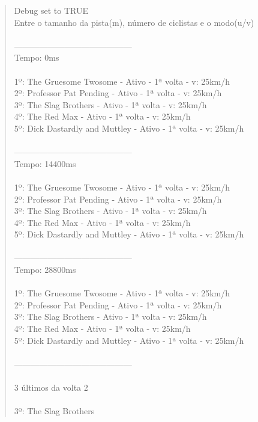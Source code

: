 \documentclass[paper=a4, fontsize=11pt]{scrartcl}
\numberwithin{equation}{section}		%
\numberwithin{figure}{section}			%
\numberwithin{table}{section}				%
\begin{document}
\begin{quote}
Debug set to TRUE
\\Entre o tamanho da pista(m), número de ciclistas e o modo(u/v)
\\
\\------------------------------------------
\\Tempo: 0ms
\\
\\1º: The Gruesome Twosome - Ativo - 1ª volta - v: 25km/h
\\2º: Professor Pat Pending - Ativo - 1ª volta - v: 25km/h
\\3º: The Slag Brothers - Ativo - 1ª volta - v: 25km/h
\\4º: The Red Max - Ativo - 1ª volta - v: 25km/h
\\5º: Dick Dastardly and Muttley - Ativo - 1ª volta - v: 25km/h
\\
\\------------------------------------------
\\Tempo: 14400ms
\\
\\1º: The Gruesome Twosome - Ativo - 1ª volta - v: 25km/h
\\2º: Professor Pat Pending - Ativo - 1ª volta - v: 25km/h
\\3º: The Slag Brothers - Ativo - 1ª volta - v: 25km/h
\\4º: The Red Max - Ativo - 1ª volta - v: 25km/h
\\5º: Dick Dastardly and Muttley - Ativo - 1ª volta - v: 25km/h
\\
\\------------------------------------------
\\Tempo: 28800ms
\\
\\1º: The Gruesome Twosome - Ativo - 1ª volta - v: 25km/h
\\2º: Professor Pat Pending - Ativo - 1ª volta - v: 25km/h
\\3º: The Slag Brothers - Ativo - 1ª volta - v: 25km/h
\\4º: The Red Max - Ativo - 1ª volta - v: 25km/h
\\5º: Dick Dastardly and Muttley - Ativo - 1ª volta - v: 25km/h
\\
\\------------------------------------------
\\
\\3 últimos da volta 2
\\
\\3º: The Slag Brothers

\end{quote}
\end{document}
